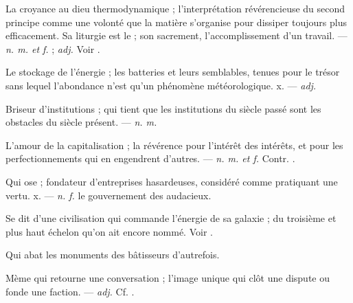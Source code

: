  La croyance au dieu thermodynamique ; l'interprétation révérencieuse du second principe comme une volonté que la matière s'organise pour dissiper toujours plus efficacement. Sa liturgie est le  ; son sacrement, l'accomplissement d'un travail. ---  \textit{n. m. et f.} ;  \textit{adj.} Voir .

 Le stockage de l'énergie ; les batteries et leurs semblables, tenues pour le trésor sans lequel l'abondance n'est qu'un phénomène météorologique.   x. ---  \textit{adj.}

 Briseur d'institutions ; qui tient que les institutions du siècle passé sont les obstacles du siècle présent. ---  \textit{n. m.}

 L'amour de la capitalisation ; la révérence pour l'intérêt des intérêts, et pour les perfectionnements qui en engendrent d'autres. ---  \textit{n. m. et f.} Contr. .

 Qui ose ; fondateur d'entreprises hasardeuses, considéré comme pratiquant une vertu.   x. ---  \textit{n. f.} le gouvernement des audacieux.

 Se dit d'une civilisation qui commande l'énergie de sa galaxie ; du troisième et plus haut échelon qu'on ait encore nommé. Voir .

 Qui abat les monuments des bâtisseurs d'autrefois.

 Mème qui retourne une conversation ; l'image unique qui clôt une dispute ou fonde une faction. ---  \textit{adj.} Cf. .

